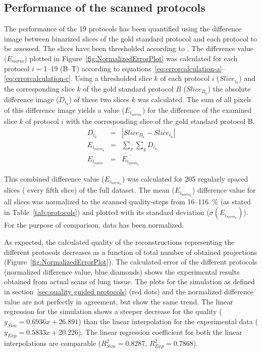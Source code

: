 \subsection{Performance of the scanned protocols}
The performance of the 19 protocols has been quantified using the difference image between binarized slices of the gold standard protocol and each protocol to be assessed. The slices have been thresholded according to . The difference value ($E_{norm}$) plotted in Figure~\ref{fig:NormalizedErrorPlot} was calculated for each protocol $i=$1--19 (B--T) according to equations~\ref{eq:errorcalculation-a}--\ref{eq:errorcalculation-c}. Using a thresholded slice $k$ of each protocol $i$ ($Slice_{i_{k}}$) and the corresponding slice $k$ of the gold standard protocol $B$ ($Slice_{B_{k}}$) the absolute difference image ($D_{i_{k}}$) of these two slices $k$ was calculated. The sum of all pixels of this difference image yields a value ($E_{i_{norm_{k}}}$) for the difference of the examined slice $k$ of protocol $i$ with the corresponding slice of the gold standard protocol B.
\begin{eqnarray}
	D_{i_{k}} &=& |Slice_{B_{k}}-Slice_{i_{k}}|\label{eq:errorcalculation-a}\\%
	E_{i_{norm_{k}}} &=& \sum_{x}\sum_{y} D_{i_{k}}\label{eq:errorcalculation-b}\\%
	E_{i_{norm}} &=& \overline{E_{i_{norm_{k}}}}\label{eq:errorcalculation-c}%
\end{eqnarray}

This combined difference value ($E_{i_{norm_{k}}}$) was calculated for 205 regularly spaced slices (%
every fifth slice) of the full dataset. The mean ($\overline{E_{i_{norm_{k}}}}$) difference value for all slices was normalized to the scanned quality-steps from 16--\SI{116}{\percent} (as stated in Table~\ref{tab:protocols}) and plotted with its standard deviation ($\sigma(E_{i_{norm_{k}}})$). For the purpose of comparison, data has been normalized.

As expected, the calculated quality of the reconstructions representing the different protocols decreases as a function of total number of obtained projections (Figure~\ref{fig:NormalizedErrorPlot}). The calculated error of the different protocols (normalized difference value, blue diamonds) shows the experimental results obtained from actual scans of lung tissue. The plots for the simulation as defined in section~\ref{sec:quality guided protocols} (red dots) and the normalized difference value are not perfectly in agreement, but show the same trend. The linear regression for the simulation shows a steeper decrease for the quality ($y_{Sim}=0.6936x+26.891$) than the linear interpolation for the experimental data ($y_{Exp}=0.5833x+20.226$). The linear regression coefficient for both the linear interpolations are comparable ($R^{2}_{Sim}=0.8287$, $R^{2}_{Exp}=0.7868$).


